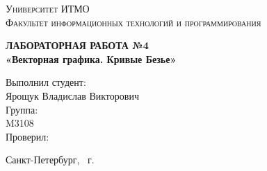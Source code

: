\begin{titlepage}
\begin{center}
\textsc{
Университет ИТМО\\[3mm]
Факультет информационных технологий и программирования}

\vfill

\textbf{
ЛАБОРАТОРНАЯ РАБОТА №4\\[3mm]
«Векторная графика. Кривые Безье»\\[20mm]}
\end{center}

\hfill
\begin{minipage}{.5\textwidth}
Выполнил студент:\\[2mm] 
Ярощук Владислав Викторович\\[4mm]
Группа:\\[2mm]
M3108\\[5mm]

Проверил:\\[7mm] 
\end{minipage}%
\vfill
\begin{center}
Санкт-Петербург, \theyear\ г.
\end{center}
\end{titlepage}

